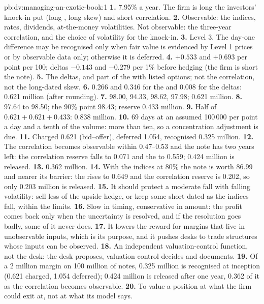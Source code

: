 \begin{solution}{pb:dv:managing-an-exotic-book:1}
\textbf{1.} 7.95\% a year. The firm is long the investors' knock-in put (long , long skew) and short correlation.
\textbf{2.} Observable: the indices, rates, dividends, at-the-money volatilities. Not observable: the three-year correlation, and the choice of volatility for the knock-in.
\textbf{3.} Level 3. The day-one difference may be recognised only when fair value is evidenced by Level 1 prices or by observable data only; otherwise it is deferred.
\textbf{4.}  $+0.533$ and $+0.693$ per point per 100; deltas $-0.143$ and $-0.279$ per 1\% before hedging (the firm is short the note).
\textbf{5.} The deltas, and part of the  with listed options; not the correlation, not the long-dated skew.
\textbf{6.} 0.266 and 0.346 for the  and 0.008 for the deltas: 0.621 million (after rounding).
\textbf{7.} 98.00, 94.33, 98.62, 97.98;  0.621 million.
\textbf{8.} 97.64 to 98.50; the 90\% point 98.43; reserve 0.433 million.
\textbf{9.} Half of $0.621+0.621+0.433$: 0.838 million.
\textbf{10.} 69 days at an assumed 100\,000 per point a day and a tenth of the volume: more than ten, so a concentration adjustment is due.
\textbf{11.} Charged 0.621 (bid--offer), deferred 1.054, recognised 0.325 million.
\textbf{12.} The correlation becomes observable within 0.47--0.53 and the note has two years left: the correlation reserve falls to 0.071 and the  to 0.559; 0.424
million is released.
\textbf{13.} 0.362 million.
\textbf{14.} With the indices at 80\% the note is worth 86.99 and nearer its barrier: the  rises to 0.649 and the correlation reserve is 0.202, so only 0.203
million is released.
\textbf{15.} It should protect a moderate fall with falling volatility: sell less of the upside hedge, or keep some short-dated  as the indices fall, within the limits.
\textbf{16.} Slow in timing, conservative in amount: the profit comes back only when the uncertainty is resolved, and if the resolution goes badly, some of it never does.
\textbf{17.} It lowers the reward for margins that live in unobservable inputs, which is its purpose, and it pushes desks to trade structures whose inputs can be observed.
\textbf{18.} An independent valuation-control function, not the desk: the desk proposes, valuation control decides and documents.
\textbf{19.} Of a 2 million margin on 100 million of notes, 0.325 million is recognised at inception (0.621 charged, 1.054 deferred); 0.424 million is released after one year,
0.362 of it as the correlation becomes observable.
\textbf{20.} To value a position at what the firm could exit at, not at what its model says.
\end{solution}

